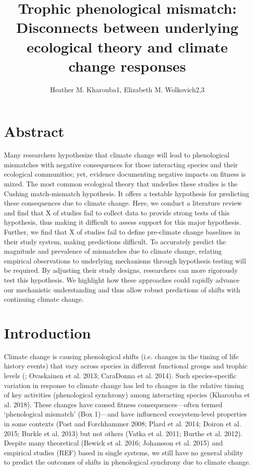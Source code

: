 \documentclass[11pt, oneside]{article}   	%
\title{Trophic phenological mismatch: Disconnects between underlying ecological theory and climate change responses}
\author{Heather M. Kharouba1, Elizabeth M. Wolkovich2,3}
\date{}						%
\begin{document}
\maketitle
\section{Abstract}
\setlength{\parindent}{10ex}
\indent
Many researchers hypothesize that climate change will lead to phenological mismatches with negative consequences for those interacting species and their ecological communities; yet, evidence documenting negative impacts on fitness is mixed. The most common ecological theory that underlies these studies is the Cushing match-mismatch hypothesis. It offers a testable hypothesis for predicting these consequences due to climate change. Here, we conduct a literature review and find that X of studies fail to collect data to provide strong tests of this hypothesis, thus making it difficult to assess support for this major hypothesis. Further, we find that X of studies fail to define pre-climate change baselines in their study system, making predictions difficult. To accurately predict the magnitude and prevalence of mismatches due to climate change, relating empirical observations to underlying mechanisms through hypothesis testing will be required. By adjusting their study designs, researchers can more rigorously test this hypothesis. We highlight how these approaches could rapidly advance our mechanistic understanding and thus allow robust predictions of shifts with continuing climate change. 

\section{Introduction}

Climate change is causing phenological shifts (i.e. changes in the timing of life history events) that vary across species in different functional groups and trophic levels (\citep{thackeray2016}; Ovaskainen et al. 2013; CaraDonna et al. 2014). Such species-specific variation in response to climate change has led to changes in the relative timing of key activities (phenological synchrony) among interacting species (Kharouba et al. 2018). These changes have caused fitness consequences—often termed ‘phenological mismatch’ (Box 1)—and have influenced ecosystem-level properties in some contexts (Post and Forchhammer 2008; Plard et al. 2014; Doiron et al. 2015; Burkle et al. 2013) but not others (Vatka et al. 2011; Burthe et al. 2012). Despite many theoretical (Bewick et al. 2016; Johansson et al. 2015) and empirical studies (REF) based in single systems, we still have no general ability to predict the outcomes of shifts in phenological synchrony due to climate change.\par
\end{document}

